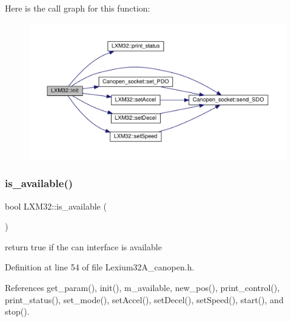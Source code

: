 Here is the call graph for this function\+:\nopagebreak
\begin{figure}[H]
\begin{center}
\leavevmode
\includegraphics[width=350pt]{class_l_x_m32_a3cec01ae3a6afe61a31bfa37f7d1436d_cgraph}
\end{center}
\end{figure}
\mbox{\label{class_l_x_m32_a0a18e2b7e7d312156457c5a5b00def2e}} 
\subsubsection{\texorpdfstring{is\+\_\+available()}{is\_available()}}
{\footnotesize\ttfamily bool L\+X\+M32\+::is\+\_\+available (\begin{DoxyParamCaption}{ }\end{DoxyParamCaption})\hspace{0.3cm}{\ttfamily [inline]}}



return true if the can interface is available 



Definition at line 54 of file Lexium32\+A\+\_\+canopen.\+h.



References get\+\_\+param(), init(), m\+\_\+available, new\+\_\+pos(), print\+\_\+control(), print\+\_\+status(), set\+\_\+mode(), set\+Accel(), set\+Decel(), set\+Speed(), start(), and stop().

